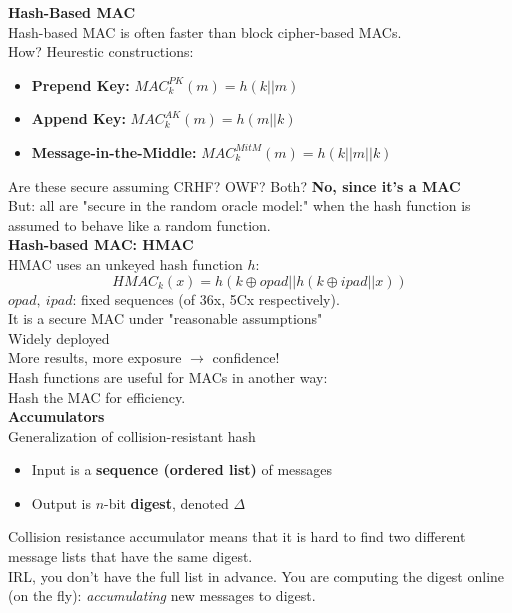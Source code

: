 \documentclass{article}
\begin{document}
\textbf{Hash-Based MAC}\\
Hash-based MAC is often faster than block cipher-based MACs.\\
How? Heurestic constructions:\begin{itemize}
	\item \textbf{Prepend Key:} $MAC_k^{PK}(m)=h(k||m)$
	\item \textbf{Append Key:} $MAC_k^{AK}(m)=h(m||k)$
	\item \textbf{Message-in-the-Middle:} $MAC_k^{MitM}(m)=h(k||m||k)$
\end{itemize}
Are these secure assuming CRHF? OWF? Both? \textbf{No, since it's a MAC}\\
But: all are "secure in the random oracle model:" when the hash function is assumed to behave like a random function.\\

\textbf{Hash-based MAC: HMAC}\\
HMAC uses an unkeyed hash function $h$:
\[HMAC_k(x)=h(k\oplus opad||h(k\oplus ipad||x))\]
$opad,\ ipad$: fixed sequences (of 36x, 5Cx respectively).\\
It is a secure MAC under "reasonable assumptions"\\
Widely deployed\\
More results, more exposure $\rightarrow$ confidence!\\
Hash functions are useful for MACs in another way:\\
Hash the MAC for efficiency.\\

\textbf{Accumulators}\\
Generalization of collision-resistant hash\begin{itemize}
	\item Input is a \textbf{sequence (ordered list)} of messages
	\item Output is $n$-bit \textbf{digest}, denoted $\Delta$
\end{itemize}
Collision resistance accumulator means that it is hard to find two different message lists that have the same digest.\\
IRL, you don't have the full list in advance. You are computing the digest online (on the fly): \textit{accumulating} new messages to digest.\\
\end{document}
